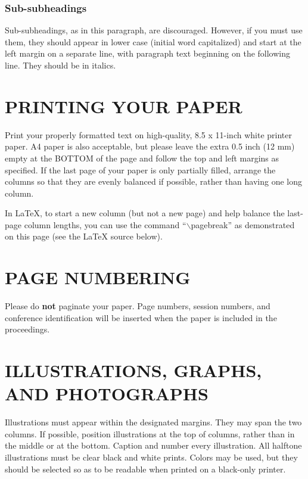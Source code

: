 \documentclass{article}
\begin{document}
	\subsubsection{Sub-subheadings}
	\label{sssec:subsubhead}
	
	Sub-subheadings, as in this paragraph, are discouraged. However, if you
	must use them, they should appear in lower case (initial word
	capitalized) and start at the left margin on a separate line, with paragraph
	text beginning on the following line.  They should be in italics.
	
	\section{PRINTING YOUR PAPER}
	\label{sec:print}
	
	Print your properly formatted text on high-quality, 8.5 x 11-inch white printer
	paper. A4 paper is also acceptable, but please leave the extra 0.5 inch (12 mm)
	empty at the BOTTOM of the page and follow the top and left margins as
	specified.  If the last page of your paper is only partially filled, arrange
	the columns so that they are evenly balanced if possible, rather than having
	one long column.
	
	In LaTeX, to start a new column (but not a new page) and help balance the
	last-page column lengths, you can use the command ``$\backslash$pagebreak'' as
	demonstrated on this page (see the LaTeX source below).
	
	\section{PAGE NUMBERING}
	\label{sec:page}
	
	Please do {\bf not} paginate your paper.  Page numbers, session numbers, and
	conference identification will be inserted when the paper is included in the
	proceedings.
	
	\section{ILLUSTRATIONS, GRAPHS, AND PHOTOGRAPHS}
	\label{sec:illust}
	
	Illustrations must appear within the designated margins.  They may span the two
	columns.  If possible, position illustrations at the top of columns, rather
	than in the middle or at the bottom.  Caption and number every illustration.
	All halftone illustrations must be clear black and white prints.  Colors may be
	used, but they should be selected so as to be readable when printed on a
	black-only printer.
	
\end{document}
